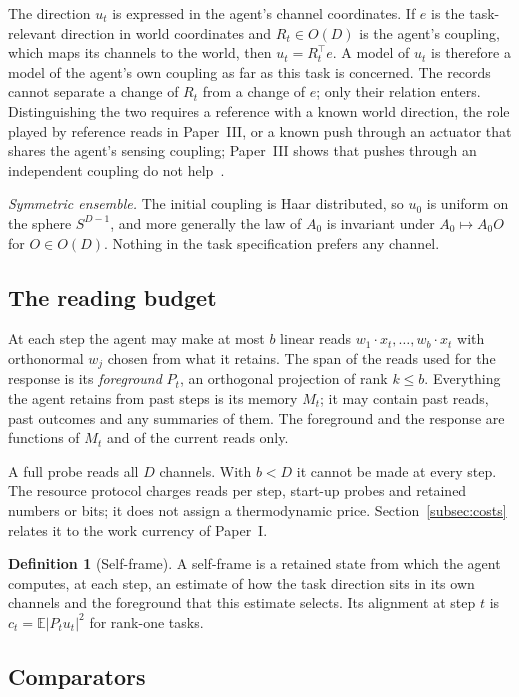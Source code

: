 \documentclass[12pt]{article}
\theoremstyle{definition}
\newtheorem{definition}[theorem]{Definition}
\newcommand{\E}{\mathbb E}
\begin{document}
The direction $u_t$ is expressed in the agent's channel coordinates. If $e$ is the task-relevant direction in world coordinates and $R_t\in O(D)$ is the agent's coupling, which maps its channels to the world, then $u_t=R_t^{\top}e$. A model of $u_t$ is therefore a model of the agent's own coupling as far as this task is concerned. The records cannot separate a change of $R_t$ from a change of $e$; only their relation enters. Distinguishing the two requires a reference with a known world direction, the role played by reference reads in Paper~III, or a known push through an actuator that shares the agent's sensing coupling; Paper~III shows that pushes through an independent coupling do not help~\cite{Liu2026TDOME_III}.

\emph{Symmetric ensemble.} The initial coupling is Haar distributed, so $u_0$ is uniform on the sphere $S^{D-1}$, and more generally the law of $A_0$ is invariant under $A_0\mapsto A_0O$ for $O\in O(D)$. Nothing in the task specification prefers any channel.

\subsection{The reading budget}

At each step the agent may make at most $b$ linear reads $w_1\cdot x_t,\dots,w_b\cdot x_t$ with orthonormal $w_j$ chosen from what it retains. The span of the reads used for the response is its \emph{foreground} $P_t$, an orthogonal projection of rank $k\le b$. Everything the agent retains from past steps is its memory $M_t$; it may contain past reads, past outcomes and any summaries of them. The foreground and the response are functions of $M_t$ and of the current reads only.

A full probe reads all $D$ channels. With $b<D$ it cannot be made at every step. The resource protocol charges reads per step, start-up probes and retained numbers or bits; it does not assign a thermodynamic price. Section~\ref{subsec:costs} relates it to the work currency of Paper~I.

\begin{definition}[Self-frame]
\label{def:frame}
A self-frame is a retained state from which the agent computes, at each step, an estimate of how the task direction sits in its own channels and the foreground that this estimate selects. Its alignment at step $t$ is $c_t=\E|P_tu_t|^2$ for rank-one tasks.
\end{definition}

\subsection{Comparators}
\end{document}
